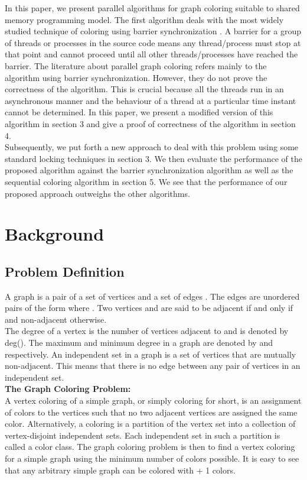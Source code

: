 \documentclass[a4paper,11pt]{article}
\begin{document}
\indent In this paper, we present parallel algorithms for graph coloring suitable to shared memory programming model. The first algorithm deals with the most widely studied technique of coloring using barrier synchronization \cite{patwary2011new,DBLP:journals/pc/CatalyurekFGHP12,boman2005scalable, DBLP:journals/concurrency/GebremedhinM00}. A barrier for a group of threads or processes in the source code means any thread/process must stop at that point and cannot proceed until all other threads/processes have reached the barrier. The literature about parallel graph coloring refers mainly to the algorithm using barrier synchronization. However, they do not prove the correctness of the algorithm. This is crucial because all the threads run in an asynchronous manner and the behaviour of a thread at a particular time instant cannot be determined. In this paper, we present a modified version of this algorithm in section 3 and give a proof of correctness of the algorithm in section 4.\\
\indent Subsequently, we put forth a new approach to deal with this problem using some standard locking techniques in section 3. We then evaluate the performance of the proposed algorithm against the barrier synchronization algorithm as well as the sequential coloring algorithm in section 5. We see that the performance of our proposed approach outweighs the other algorithms.
\section{Background}
\subsection{Problem Definition}
A graph  is a pair  of a set of vertices  and a set of edges . The edges are unordered pairs of the form  where   . Two vertices  and  are said to be adjacent if and only if    and non-adjacent otherwise.\\
The degree of a vertex  is the number of vertices adjacent to  and is denoted by deg(). The maximum and minimum degree in a graph  are denoted by  and  respectively. An independent set in a graph is a set of vertices that are mutually non-adjacent. This means that there is no edge between any pair of vertices in an independent set.\\
\newline
\textbf{The Graph Coloring Problem:}\\
A vertex coloring of a simple graph, or simply coloring for short, is an assignment of colors to the vertices such that no two adjacent vertices are assigned the same color. Alternatively, a coloring is a partition of the vertex set into a collection of vertex-disjoint independent sets. Each independent set in such a partition is called a color class. The graph coloring problem is then to find a vertex coloring for a simple graph using the minimum number of colors possible. It is easy to see that any arbitrary simple graph can be colored with  + 1 colors.
\end{document}
